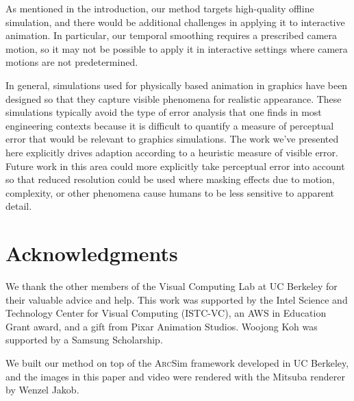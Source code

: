 \documentclass[10pt,journal,compsoc,twoside]{TexInputs/IEEEtran}
\newcommand{\arcsim}{\textsc{Arc}Sim\xspace}
\begin{document}
As mentioned in the introduction, our method targets high-quality offline simulation,
and there would be additional challenges in applying it to interactive animation.
In particular, our temporal smoothing requires a prescribed camera motion, so it may not be possible to apply it in interactive settings 
where camera motions are not predetermined. 

\vspace{.1in}

In general, simulations used for physically based animation in
graphics have been designed so that they capture visible phenomena for
realistic appearance.  These simulations typically avoid the type of
error analysis that one finds in most engineering contexts because it
is difficult to quantify a measure of perceptual error that would be
relevant to graphics simulations.  The work we've presented here
explicitly drives adaption according to a heuristic measure of visible
error.  Future work in this area could more explicitly
take perceptual error into account so that reduced resolution could be
used where masking effects due to motion, complexity, or other
phenomena cause humans to be less sensitive to apparent detail.



\section*{Acknowledgments}
We thank the other members of the Visual Computing Lab at UC Berkeley for their
valuable advice and help. This work was supported by the Intel Science and Technology
Center for Visual Computing (ISTC-VC), an AWS in Education Grant
award, and a gift from Pixar Animation Studios.  Woojong Koh was supported by a
Samsung Scholarship.

We built our method on top of the \arcsim framework developed in UC Berkeley, and the
images in this paper and video were rendered with the Mitsuba renderer by Wenzel Jakob.

\vspace*{.1in}



\end{document}
